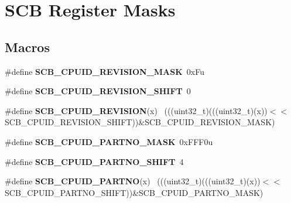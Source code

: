 \hypertarget{group___s_c_b___register___masks}{}\section{S\+C\+B Register Masks}
\label{group___s_c_b___register___masks}
\subsection*{Macros}
\begin{DoxyCompactItemize}
\item 
\hypertarget{group___s_c_b___register___masks_ga85fcec5a1a285bf2ead09d715e7fd825}{}\#define {\bfseries S\+C\+B\+\_\+\+C\+P\+U\+I\+D\+\_\+\+R\+E\+V\+I\+S\+I\+O\+N\+\_\+\+M\+A\+S\+K}~0x\+Fu\label{group___s_c_b___register___masks_ga85fcec5a1a285bf2ead09d715e7fd825}

\item 
\hypertarget{group___s_c_b___register___masks_ga6c4bd208cc5af38612bf38b291f8312d}{}\#define {\bfseries S\+C\+B\+\_\+\+C\+P\+U\+I\+D\+\_\+\+R\+E\+V\+I\+S\+I\+O\+N\+\_\+\+S\+H\+I\+F\+T}~0\label{group___s_c_b___register___masks_ga6c4bd208cc5af38612bf38b291f8312d}

\item 
\hypertarget{group___s_c_b___register___masks_gad84b7d9f172bb11a61e873c8316feaac}{}\#define {\bfseries S\+C\+B\+\_\+\+C\+P\+U\+I\+D\+\_\+\+R\+E\+V\+I\+S\+I\+O\+N}(x)                                    ~(((uint32\+\_\+t)(((uint32\+\_\+t)(x))$<$$<$S\+C\+B\+\_\+\+C\+P\+U\+I\+D\+\_\+\+R\+E\+V\+I\+S\+I\+O\+N\+\_\+\+S\+H\+I\+F\+T))\&S\+C\+B\+\_\+\+C\+P\+U\+I\+D\+\_\+\+R\+E\+V\+I\+S\+I\+O\+N\+\_\+\+M\+A\+S\+K)\label{group___s_c_b___register___masks_gad84b7d9f172bb11a61e873c8316feaac}

\item 
\hypertarget{group___s_c_b___register___masks_ga59f6aaadd9ecf7fed4e622ab8052f8d4}{}\#define {\bfseries S\+C\+B\+\_\+\+C\+P\+U\+I\+D\+\_\+\+P\+A\+R\+T\+N\+O\+\_\+\+M\+A\+S\+K}~0x\+F\+F\+F0u\label{group___s_c_b___register___masks_ga59f6aaadd9ecf7fed4e622ab8052f8d4}

\item 
\hypertarget{group___s_c_b___register___masks_gac28acf4ce5242a53961b9549e7dd0115}{}\#define {\bfseries S\+C\+B\+\_\+\+C\+P\+U\+I\+D\+\_\+\+P\+A\+R\+T\+N\+O\+\_\+\+S\+H\+I\+F\+T}~4\label{group___s_c_b___register___masks_gac28acf4ce5242a53961b9549e7dd0115}

\item 
\hypertarget{group___s_c_b___register___masks_gafa3a6f28ced4e51aab9188686cc87434}{}\#define {\bfseries S\+C\+B\+\_\+\+C\+P\+U\+I\+D\+\_\+\+P\+A\+R\+T\+N\+O}(x)                                        ~(((uint32\+\_\+t)(((uint32\+\_\+t)(x))$<$$<$S\+C\+B\+\_\+\+C\+P\+U\+I\+D\+\_\+\+P\+A\+R\+T\+N\+O\+\_\+\+S\+H\+I\+F\+T))\&S\+C\+B\+\_\+\+C\+P\+U\+I\+D\+\_\+\+P\+A\+R\+T\+N\+O\+\_\+\+M\+A\+S\+K)\label{group___s_c_b___register___masks_gafa3a6f28ced4e51aab9188686cc87434}


\end{DoxyCompactItemize}
